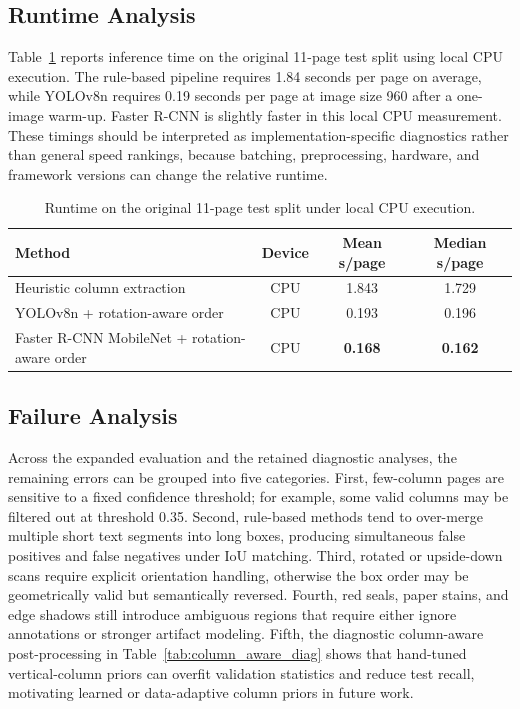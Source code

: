 \documentclass[pdflatex,sn-mathphys-num]{sn-jnl}
\begin{document}
\subsection{Runtime Analysis}
Table~\ref{tab:runtime} reports inference time on the original 11-page test split using local CPU execution. The rule-based pipeline requires 1.84 seconds per page on average, while YOLOv8n requires 0.19 seconds per page at image size 960 after a one-image warm-up. Faster R-CNN is slightly faster in this local CPU measurement. These timings should be interpreted as implementation-specific diagnostics rather than general speed rankings, because batching, preprocessing, hardware, and framework versions can change the relative runtime.

\begin{table}[t]
\centering
\scriptsize\setlength{\tabcolsep}{3pt}
\caption{Runtime on the original 11-page test split under local CPU execution.}
\label{tab:runtime}
\begin{tabular}{lccc}
\toprule
Method & Device & Mean s/page & Median s/page \\
\midrule
Heuristic column extraction & CPU & 1.843 & 1.729 \\
YOLOv8n + rotation-aware order & CPU & 0.193 & 0.196 \\
Faster R-CNN MobileNet + rotation-aware order & CPU & \textbf{0.168} & \textbf{0.162} \\
\bottomrule
\end{tabular}
\end{table}

\subsection{Failure Analysis}
Across the expanded evaluation and the retained diagnostic analyses, the remaining errors can be grouped into five categories. First, few-column pages are sensitive to a fixed confidence threshold; for example, some valid columns may be filtered out at threshold 0.35. Second, rule-based methods tend to over-merge multiple short text segments into long boxes, producing simultaneous false positives and false negatives under IoU matching. Third, rotated or upside-down scans require explicit orientation handling, otherwise the box order may be geometrically valid but semantically reversed. Fourth, red seals, paper stains, and edge shadows still introduce ambiguous regions that require either ignore annotations or stronger artifact modeling. Fifth, the diagnostic column-aware post-processing in Table~\ref{tab:column_aware_diag} shows that hand-tuned vertical-column priors can overfit validation statistics and reduce test recall, motivating learned or data-adaptive column priors in future work.
\end{document}
